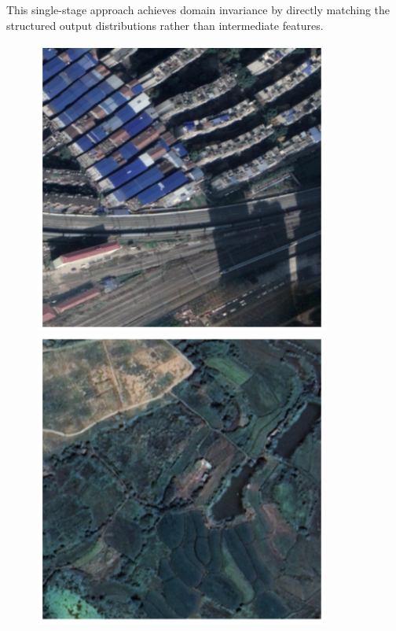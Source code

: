 \documentclass{article}
\begin{document}
\begin{multicols}{2}
This single-stage approach achieves domain invariance by directly matching the structured output distributions rather than intermediate features.  
\begin{figure}[H]
	\centering
	\begin{minipage}{0.48\linewidth}
		\centering
		\includegraphics[width=1\linewidth]{image/dacs_source2.png}

		
	\end{minipage}
	\begin{minipage}{0.48\linewidth}
		\centering
		\includegraphics[width=1\linewidth]{image/dacs_target2.png}


\end{minipage}
\end{figure}
\end{multicols}
\end{document}
